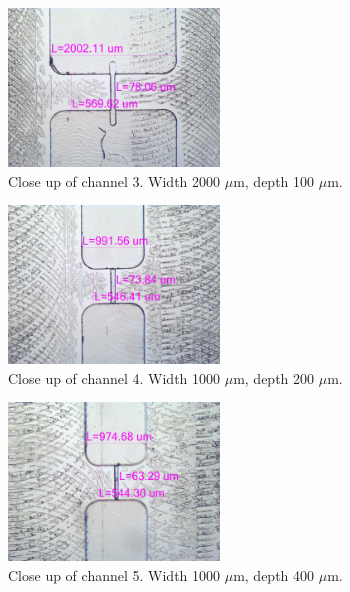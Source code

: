 \documentclass[journal, a4paper]{IEEEtran}
\begin{document}
\begin{figure}
\begin{center}
\includegraphics[width=0.5\textwidth]{w2000d100Dim.jpg}
		\caption{\label{fig:3channel} Close up of channel 3. Width 2000 $\mu$m, depth 100 $\mu$m.}
        \end{center}
\end{figure}

\begin{figure}
\begin{center}
\includegraphics[width=0.5\textwidth]{w1000d200Dim.jpg}
		\caption{\label{fig:4channel} Close up of channel 4. Width 1000 $\mu$m, depth 200 $\mu$m.}
        \end{center}
\end{figure}
    
\begin{figure}
\begin{center}
\includegraphics[width=0.5\textwidth]{w1000d400Dim.jpg}
		\caption{\label{fig:5channel} Close up of channel 5. Width 1000 $\mu$m, depth 400 $\mu$m.}
        \end{center}
	\end{figure}
\end{document}
